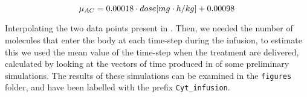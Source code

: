 $$ \mu_{AC} = 0.00018 \cdot \small{dose} [mg \cdot h/kg]+ 0.00098 $$

Interpolating the two data points present in \cite{main-paper}. 
Then, we needed the number of molecules that enter the body at each time-step during the infusion, to estimate this we used the mean value of the time-step when the treatment are delivered, calculated by looking at the vectors of time produced in of some preliminary simulations. The results of these simulations can be examined in the \texttt{figures} folder, and have been labelled with the prefix \texttt{Cyt_infusion}. 
